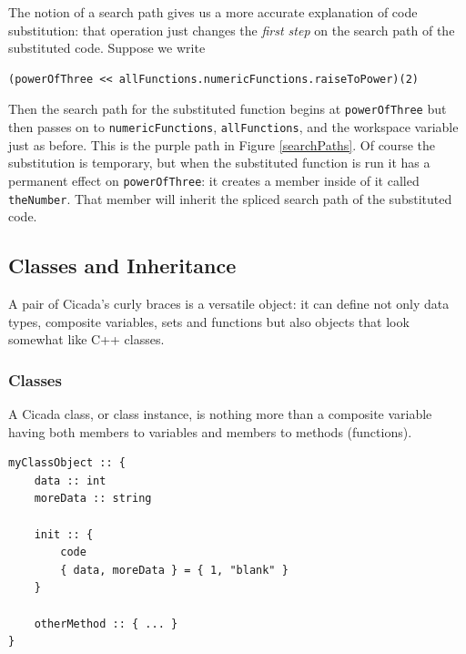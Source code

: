 \documentclass{article}
\newenvironment{code}{
       \begin{list}{}{
               \setlength{\leftmargin}{.4in}
               \setlength{\rightmargin}{0in}
               \setlength{\topsep}{.2in}
       }
       \small
       \item[] }
       { \end{list}   }
\begin{document}
The notion of a search path gives us a more accurate explanation of code substitution:  that operation just changes the \emph{first step} on the search path of the substituted code.  Suppose we write

\begin{code} \begin{verbatim}
(powerOfThree << allFunctions.numericFunctions.raiseToPower)(2)
\end{verbatim} \end{code}

\noindent Then the search path for the substituted function begins at \verb#powerOfThree# but then passes on to \verb#numericFunctions#, \verb#allFunctions#, and the workspace variable just as before.  This is the purple path in Figure \ref{searchPaths}.  Of course the substitution is temporary, but when the substituted function is run it has a permanent effect on \verb#powerOfThree#:  it creates a member inside of it called \verb#theNumber#.  That member will inherit the spliced search path of the substituted code.










\subsection{Classes and Inheritance}

A pair of Cicada's curly braces is a versatile object:  it can define not only data types, composite variables, sets and functions but also objects that look somewhat like C++ classes.







\subsubsection{Classes}

A Cicada class, or class instance, is nothing more than a composite variable having both members to variables and members to methods (functions).

\begin{code} \begin{verbatim}
myClassObject :: {
    data :: int
    moreData :: string
    
    init :: {
        code
        { data, moreData } = { 1, "blank" }
    }
    
    otherMethod :: { ... }
}
\end{verbatim} \end{code}
\end{document}
